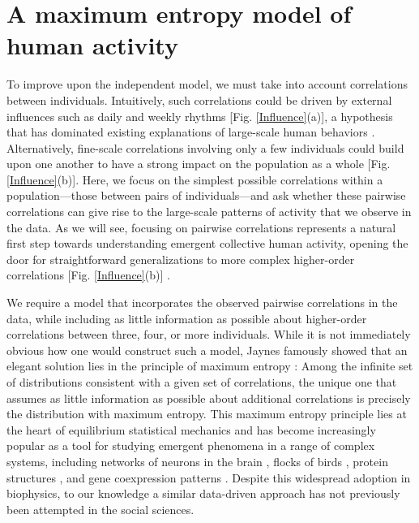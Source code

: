 \documentclass[aps,reprint,superscriptaddress,amsmath,amssymb,longbibliography]{revtex4-1}
\begin{document}
\section{A maximum entropy model of human activity}

To improve upon the independent model, we must take into account correlations between individuals. Intuitively, such correlations could be driven by external influences such as daily and weekly rhythms [Fig. \ref{Influence}(a)], a hypothesis that has dominated existing explanations of large-scale human behaviors \cite{Peng-01,Bagrow-01,Crane-01,Candia-01}. Alternatively, fine-scale correlations involving only a few individuals could build upon one another to have a strong impact on the population as a whole [Fig. \ref{Influence}(b)]. Here, we focus on the simplest possible correlations within a population---those between pairs of individuals---and ask whether these pairwise correlations can give rise to the large-scale patterns of activity that we observe in the data. As we will see, focusing on pairwise correlations represents a natural first step towards understanding emergent collective human activity, opening the door for straightforward generalizations to more complex higher-order correlations [Fig. \ref{Influence}(b)] \cite{Ganmor-01, Marre-01}.

We require a model that incorporates the observed pairwise correlations in the data, while including as little information as possible about higher-order correlations between three, four, or more individuals. While it is not immediately obvious how one would construct such a model, Jaynes famously showed that an elegant solution lies in the principle of maximum entropy \cite{Jaynes-01}: Among the infinite set of distributions consistent with a given set of correlations, the unique one that assumes as little information as possible about additional correlations is precisely the distribution with maximum entropy. This maximum entropy principle lies at the heart of equilibrium statistical mechanics \cite{Jaynes-01, Cover-01} and has become increasingly popular as a tool for studying emergent phenomena in a range of complex systems, including networks of neurons in the brain \cite{Schneidman-01,Ganmor-01}, flocks of birds \cite{Bialek-01}, protein structures \cite{Weigt-01}, and gene coexpression patterns \cite{Lezon-01}. Despite this widespread adoption in biophysics, to our knowledge a similar data-driven approach has not previously been attempted in the social sciences.
\end{document}
